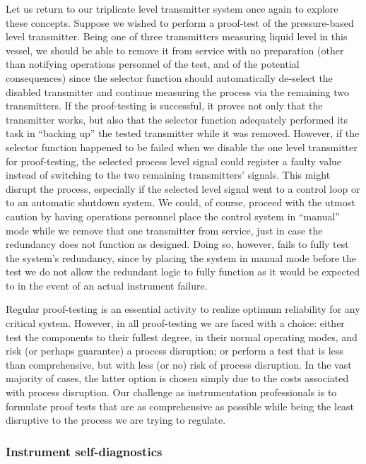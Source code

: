 Let us return to our triplicate level transmitter system once again to explore these concepts.  Suppose we wished to perform a proof-test of the pressure-based level transmitter.  Being one of three transmitters measuring liquid level in this vessel, we should be able to remove it from service with no preparation (other than notifying operations personnel of the test, and of the potential consequences) since the selector function should automatically de-select the disabled transmitter and continue measuring the process via the remaining two transmitters.  If the proof-testing is successful, it proves not only that the transmitter works, but also that the selector function adequately performed its task in ``backing up'' the tested transmitter while it was removed.  However, if the selector function happened to be failed when we disable the one level transmitter for proof-testing, the selected process level signal could register a faulty value instead of switching to the two remaining transmitters' signals.  This might disrupt the process, especially if the selected level signal went to a control loop or to an automatic shutdown system.  We could, of course, proceed with the utmost caution by having operations personnel place the control system in ``manual'' mode while we remove that one transmitter from service, just in case the redundancy does not function as designed.  Doing so, however, fails to fully test the system's redundancy, since by placing the system in manual mode before the test we do not allow the redundant logic to fully function as it would be expected to in the event of an actual instrument failure.

\vskip 10pt

Regular proof-testing is an essential activity to realize optimum reliability for any critical system.  However, in all proof-testing we are faced with a choice: either test the components to their fullest degree, in their normal operating modes, and risk (or perhaps guarantee) a process disruption; or perform a test that is less than comprehensive, but with less (or no) risk of process disruption.  In the vast majority of cases, the latter option is chosen simply due to the costs associated with process disruption.  Our challenge as instrumentation professionals is to formulate proof tests that are as comprehensive as possible while being the least disruptive to the process we are trying to regulate.




\filbreak
\subsubsection{Instrument self-diagnostics}

